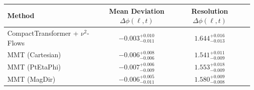     \begin{tabular}{lccc}
        \toprule
        Method & Mean Deviation $\Delta\phi(\ell, t)$ & Resolution $\Delta\phi(\ell, t)$ \\
        \midrule
        CompactTransformer + $\nu^2$-Flows & $-0.003^{+0.010}_{-0.011}$ & $1.644^{+0.016}_{-0.013}$ \\
        MMT (Cartesian) & $-0.006^{+0.008}_{-0.006}$ & $1.541^{+0.011}_{-0.009}$ \\
        MMT (PtEtaPhi) & $-0.007^{+0.006}_{-0.009}$ & $1.553^{+0.018}_{-0.009}$ \\
        MMT (MagDir) & $-0.006^{+0.005}_{-0.011}$ & $1.580^{+0.009}_{-0.008}$ \\
        \bottomrule
    \end{tabular}